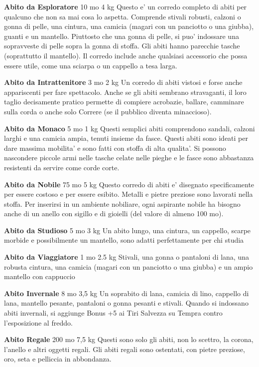 \documentclass[a4paper,11pt,twoside,openany]{book}
\begin{document}
{\textbf{Abito da Esploratore} 10 mo 4 kg Questo e' un corredo completo di abiti per qualcuno che non sa mai cosa lo aspetta. Comprende stivali robusti, calzoni o gonna di pelle, una cintura, una camicia (magari con un panciotto o una giubba), guanti e un mantello. Piuttosto che una gonna di pelle, si puo' indossare una sopravveste di pelle sopra la gonna di stoffa. Gli abiti hanno parecchie tasche (soprattutto il mantello). Il corredo include anche qualsiasi accessorio che possa essere utile, come una sciarpa o un cappello a tesa larga.

\textbf{Abito da Intrattenitore} 3 mo 2 kg Un corredo di abiti vistosi e forse anche appariscenti per fare spettacolo. Anche se gli abiti sembrano stravaganti, il loro taglio decisamente pratico permette di compiere acrobazie, ballare, camminare sulla corda o anche solo Correre (se il pubblico diventa minaccioso).

\textbf{Abito da Monaco} 5 mo 1 kg Questi semplici abiti comprendono sandali, calzoni larghi e una camicia ampia, tenuti insieme da fasce. Questi abiti sono ideati per dare massima mobilita' e sono fatti con stoffa di alta qualita'. Si possono nascondere piccole armi nelle tasche celate nelle pieghe e le fasce sono abbastanza resistenti da servire come corde corte.

\textbf{Abito da Nobile} 75 mo 5 kg Questo corredo di abiti e' disegnato specificamente per essere costoso e per essere esibito. Metalli e pietre preziose sono lavorati nella stoffa. Per inserirsi in un ambiente nobiliare, ogni aspirante nobile ha bisogno anche di un anello con sigillo e di gioielli (del valore di almeno 100 mo).

\textbf{Abito da Studioso} 5 mo 3 kg Un abito lungo, una cintura, un cappello, scarpe morbide e possibilmente un mantello, sono adatti perfettamente per chi studia

\textbf{Abito da Viaggiatore} 1 mo 2.5 kg Stivali, una gonna o pantaloni di lana, una robusta cintura, una camicia (magari con un panciotto o una giubba) e un ampio mantello con cappuccio

\textbf{Abito Invernale} 8 mo 3,5 kg Un soprabito di lana, camicia di lino, cappello di lana, mantello pesante, pantaloni o gonna pesanti e stivali. Quando si indossano abiti invernali, si aggiunge Bonus +5 ai Tiri Salvezza su Tempra contro l'esposizione al freddo.

\textbf{Abito Regale} 200 mo 7,5 kg Questi sono solo gli abiti, non lo scettro, la corona, l'anello e altri oggetti regali. Gli abiti regali sono ostentati, con pietre preziose, oro, seta e pelliccia in abbondanza.

}
\end{document}
